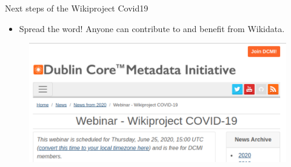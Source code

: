 \documentclass{beamer}
\begin{document}
\begin{frame}{Next steps of the Wikiproject Covid19}
\begin{itemize}
    \item Spread the word! Anyone can contribute to and benefit from Wikidata. 
\end{itemize}
\begin{figure}
\includegraphics[scale=0.65]{fig/dcmi.png}
\end{figure}
\end{frame}




\begin{frame}
  \titlepage
\end{frame}
{

}
\end{document}
